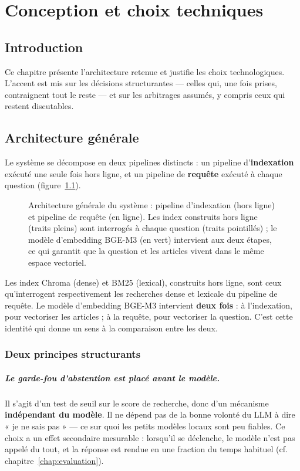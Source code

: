 \chapter{Conception et choix techniques}
\label{chap:conception}

\section*{Introduction}

Ce chapitre présente l'architecture retenue et justifie les choix technologiques. L'accent est
mis sur les décisions structurantes --- celles qui, une fois prises, contraignent tout le reste
--- et sur les arbitrages assumés, y compris ceux qui restent discutables.

\section{Architecture générale}

Le système se décompose en deux pipelines distincts : un pipeline d'\textbf{indexation} exécuté
une seule fois hors ligne, et un pipeline de \textbf{requête} exécuté à chaque question
(figure~\ref{fig:architecture}).

\begin{figure}[H]
    \centering
    
    \caption{Architecture générale du système : pipeline d'indexation (hors ligne) et pipeline
    de requête (en ligne). Les index construits hors ligne (traits pleins) sont interrogés à
    chaque question (traits pointillés) ; le modèle d'embedding BGE-M3 (en vert) intervient aux
    deux étapes, ce qui garantit que la question et les articles vivent dans le même espace
    vectoriel.}
    \label{fig:architecture}
\end{figure}

Les index Chroma (dense) et BM25 (lexical), construits hors ligne, sont ceux qu'interrogent
respectivement les recherches dense et lexicale du pipeline de requête. Le modèle d'embedding
BGE-M3 intervient \textbf{deux fois} : à l'indexation, pour vectoriser les articles ; à la
requête, pour vectoriser la question. C'est cette identité qui donne un sens à la comparaison
entre les deux.

\subsection{Deux principes structurants}

\paragraph{Le garde-fou d'abstention est placé \emph{avant} le modèle.}
Il s'agit d'un test de seuil sur le score de recherche, donc d'un mécanisme
\textbf{indépendant du modèle}. Il ne dépend pas de la bonne volonté du LLM à dire « je ne sais
pas » --- ce sur quoi les petits modèles locaux sont peu fiables. Ce choix a un effet secondaire
mesurable : lorsqu'il se déclenche, le modèle n'est pas appelé du tout, et la réponse est rendue
en une fraction du temps habituel (cf. chapitre~\ref{chap:evaluation}).

